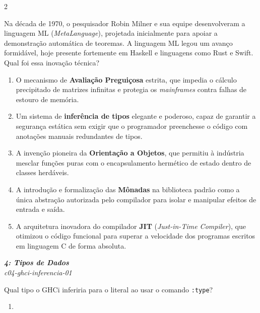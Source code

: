 \documentclass[a4paper,10pt,brazil]{article}
\begin{document}
\begin{multicols}{2}
\begin{flushright}
\end{flushright}
Na década de 1970, o pesquisador Robin Milner e sua equipe desenvolveram a linguagem ML (\emph{MetaLanguage}), projetada inicialmente para apoiar a demonstração automática de teoremas. A linguagem ML legou um avanço formidável, hoje presente fortemente em Haskell e linguagens como Rust e Swift. Qual foi essa inovação técnica?

\begin{enumerate}
  \item O mecanismo de \textbf{Avaliação Preguiçosa} estrita, que impedia o cálculo precipitado de matrizes infinitas e protegia os \emph{mainframes} contra falhas de estouro de memória.

  \item Um sistema de \textbf{inferência de tipos} elegante e poderoso, capaz de garantir a segurança estática sem exigir que o programador preenchesse o código com anotações manuais redundantes de tipos.

  \item A invenção pioneira da \textbf{Orientação a Objetos}, que permitiu à indústria mesclar funções puras com o encapsulamento hermético de estado dentro de classes herdáveis.

  \item A introdução e formalização das \textbf{Mônadas} na biblioteca padrão como a única abstração autorizada pelo compilador para isolar e manipular efeitos de entrada e saída.

  \item A arquitetura inovadora do compilador \textbf{JIT} (\emph{Just-in-Time Compiler}), que otimizou o código funcional para superar a velocidade dos programas escritos em linguagem C de forma absoluta.


\end{enumerate}

\begin{flushright}
  \footnotesize
  \textit{\textbf{4: Tipos de Dados}}\\
  \textit{c04-ghci-inferencia-01}\\

\end{flushright}
Qual tipo o GHCi inferiria para o literal  ao usar o comando \texttt{:type}?

\begin{enumerate}
  \item {}


\end{enumerate}
\end{multicols}
\end{document}
